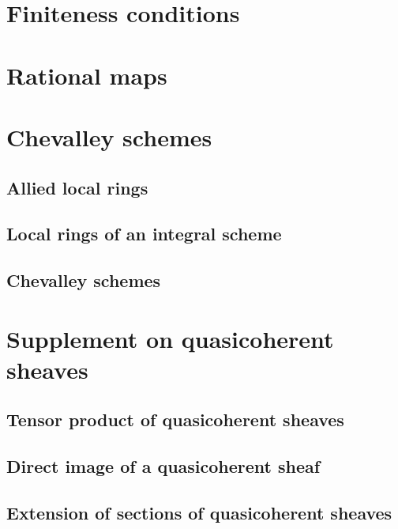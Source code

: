     \section{Finiteness conditions}

    \section{Rational maps}

    \section{Chevalley schemes}

        \subsection{Allied local rings}
        

        \subsection{Local rings of an integral scheme}
        

        \subsection{Chevalley schemes}
        

    \section{Supplement on quasicoherent sheaves}

        \subsection{Tensor product of quasicoherent sheaves}
        

        \subsection{Direct image of a quasicoherent sheaf}
        
        
        \subsection{Extension of sections of quasicoherent sheaves}
        
        
